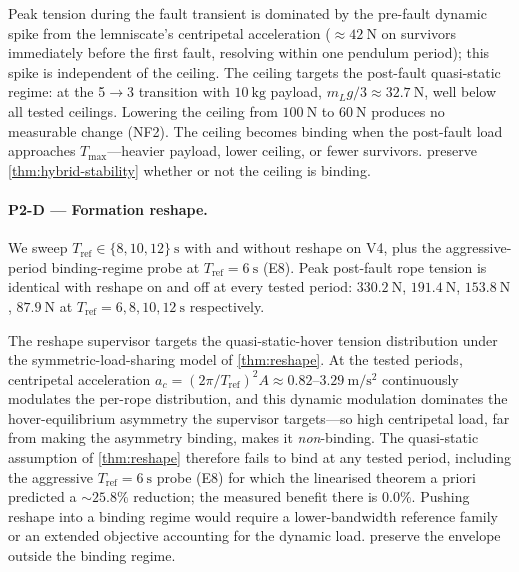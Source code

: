 \begin{remark}
\label{rem:mpc-null}
  Peak tension during the fault transient is dominated by the pre-fault dynamic spike from the lemniscate's centripetal acceleration ($\approx \SI{42}{\newton}$ on survivors immediately before the first fault, resolving within one pendulum period); this spike is independent of the ceiling. The ceiling targets the post-fault quasi-static regime: at the 5$\to$3 transition with $\SI{10}{\kilo\gram}$ payload, $m_L g / 3 \approx \SI{32.7}{\newton}$, well below all tested ceilings. Lowering the ceiling from $\SI{100}{\newton}$ to $\SI{60}{\newton}$ produces no measurable change (NF2). The ceiling becomes binding when the post-fault load approaches $T_{\max}$---heavier payload, lower ceiling, or fewer survivors.  preserve \cref{thm:hybrid-stability} whether or not the ceiling is binding.
\end{remark}

\paragraph{P2-D --- Formation reshape.} We sweep $T_{\mathrm{ref}} \in \{8, 10, 12\}~\si{\second}$ with and without reshape on V4, plus the aggressive-period binding-regime probe at $T_{\mathrm{ref}}=\SI{6}{\second}$ (E8). Peak post-fault rope tension is identical with reshape on and off at every tested period: $\SI{330.2}{\newton}$, $\SI{191.4}{\newton}$, $\SI{153.8}{\newton}$, $\SI{87.9}{\newton}$ at $T_{\mathrm{ref}} = 6, 8, 10, 12~\si{\second}$ respectively.

\begin{remark}
\label{rem:reshape-null}
  The reshape supervisor targets the quasi-static-hover tension distribution under the symmetric-load-sharing model of \cref{thm:reshape}. At the tested periods, centripetal acceleration $a_c = (2\pi/T_{\mathrm{ref}})^2 A \approx 0.82$--$3.29~\si{\metre\per\second\squared}$ continuously modulates the per-rope distribution, and this dynamic modulation dominates the hover-equilibrium asymmetry the supervisor targets---so high centripetal load, far from making the asymmetry binding, makes it \emph{non}-binding. The quasi-static assumption of \cref{thm:reshape} therefore fails to bind at any tested period, including the aggressive $T_{\mathrm{ref}}=\SI{6}{\second}$ probe (E8) for which the linearised theorem a priori predicted a $\sim 25.8\%$ reduction; the measured benefit there is $0.0\%$. Pushing reshape into a binding regime would require a lower-bandwidth reference family or an extended objective accounting for the dynamic load.  preserve the envelope outside the binding regime.
\end{remark}


